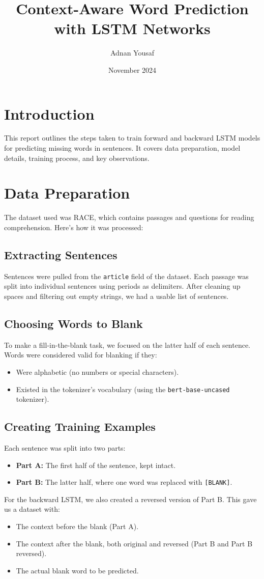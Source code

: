 \documentclass{article}
\title{Context-Aware Word Prediction with LSTM Networks}
\author{Adnan Yousaf}
\date{November 2024}
\begin{document}
\maketitle

\section*{Introduction}
This report outlines the steps taken to train forward and backward LSTM models for predicting missing words in sentences. It covers data preparation, model details, training process, and key observations.

\section{Data Preparation}
The dataset used was RACE, which contains passages and questions for reading comprehension. Here's how it was processed:

\subsection{Extracting Sentences}
Sentences were pulled from the \texttt{article} field of the dataset. Each passage was split into individual sentences using periods as delimiters. After cleaning up spaces and filtering out empty strings, we had a usable list of sentences.

\subsection{Choosing Words to Blank}
To make a fill-in-the-blank task, we focused on the latter half of each sentence. Words were considered valid for blanking if they:
\begin{itemize}
    \item Were alphabetic (no numbers or special characters).
    \item Existed in the tokenizer's vocabulary (using the \texttt{bert-base-uncased} tokenizer).
\end{itemize}

\subsection{Creating Training Examples}
Each sentence was split into two parts:
\begin{itemize}
    \item \textbf{Part A:} The first half of the sentence, kept intact.
    \item \textbf{Part B:} The latter half, where one word was replaced with \texttt{[BLANK]}.
\end{itemize}
For the backward LSTM, we also created a reversed version of Part B. This gave us a dataset with:
\begin{itemize}
    \item The context before the blank (Part A).
    \item The context after the blank, both original and reversed (Part B and Part B reversed).
    \item The actual blank word to be predicted.
\end{itemize}
\end{document}

